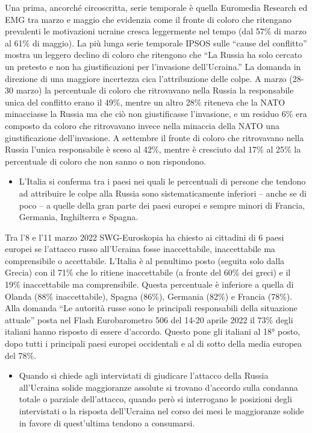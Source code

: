 \documentclass[
]{book}
\providecommand{\tightlist}{%
  \setlength{\itemsep}{0pt}\setlength{\parskip}{0pt}}
\begin{document}
Una prima, ancorché circoscritta, serie temporale è quella Euromedia Research ed EMG tra marzo e maggio che evidenzia come il fronte di coloro che ritengano prevalenti le motivazioni ucraine cresca leggermente nel tempo (dal 57\% di marzo al 61\% di maggio). La più lunga serie temporale IPSOS sulle ``cause del conflitto'' mostra un leggero declino di coloro che ritengono che ``La Russia ha solo cercato un pretesto e non ha giustificazioni per l'invasione dell'Ucraina.'' La domanda in direzione di una maggiore incertezza cica l'attribuzione delle colpe. A marzo (28-30 marzo) la percentuale di coloro che ritrovavano nella Russia la responsabile unica del conflitto erano il 49\%, mentre un altro 28\% riteneva che la NATO minacciasse la Russia ma che ciò non giustificasse l'invasione, e un residuo 6\% era composto da coloro che ritrovavano invece nella minaccia della NATO una giustificazione dell'invasione. A settembre il fronte di coloro che ritrovavano nella Russia l'unica responsabile è sceso al 42\%, mentre è cresciuto dal 17\% al 25\% la percentuale di coloro che non sanno o non rispondono.

\begin{itemize}
\tightlist
\item
  L'Italia si conferma tra i paesi nei quali le percentuali di persone che tendono ad attribuire le colpe alla Russia sono sistematicamente inferiori -- anche se di poco -- a quelle della gran parte dei paesi europei e sempre minori di Francia, Germania, Inghilterra e Spagna.
\end{itemize}

Tra l'8 e l'11 marzo 2022 SWG-Euroskopia ha chiesto ai cittadini di 6 paesi europei se l'attacco russo all'Ucraina fosse inaccettabile, inaccettabile ma comprensibile o accettabile. L'Italia è al penultimo posto (seguita solo dalla Grecia) con il 71\% che lo ritiene inaccettabile (a fronte del 60\% dei greci) e il 19\% inaccettabile ma comprensibile. Questa percentuale è inferiore a quella di Olanda (88\% inaccettabile), Spagna (86\%), Germania (82\%) e Francia (78\%). Alla domanda ``Le autorità russe sono le principali responsabili della situazione attuale'' posta nel Flash Eurobarometro 506 del 14-20 aprile 2022 il 73\% degli italiani hanno risposto di essere d'accordo. Questo pone gli italiani al 18° posto, dopo tutti i principali paesi europei occidentali e al di sotto della media europea del 78\%.

\begin{itemize}
\tightlist
\item
  Quando si chiede agli intervistati di giudicare l'attacco della Russia all'Ucraina solide maggioranze assolute si trovano d'accordo sulla condanna totale o parziale dell'attacco, quando però si interrogano le posizioni degli intervistati o la risposta dell'Ucraina nel corso dei mesi le maggioranze solide in favore di quest'ultima tendono a consumarsi.
\end{itemize}
\end{document}
